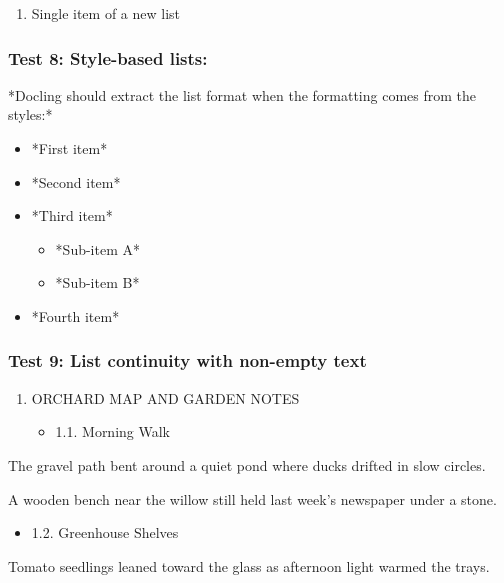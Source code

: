 \documentclass[11pt,a4paper]{article}
\begin{document}
\begin{enumerate}
\item Single item of a new list
\end{enumerate}

\subsubsection{Test 8: Style-based lists:}

*Docling should extract the list format when the formatting comes from the styles:*

\begin{itemize}
\item *First item*
\item *Second item*
\item *Third item*
  \begin{itemize}
\item *Sub-item A*
\item *Sub-item B*
  \end{itemize}
\item *Fourth item*
\end{itemize}

\subsubsection{Test 9: List continuity with non-empty text}

\begin{enumerate}
\item ORCHARD MAP AND GARDEN NOTES
  \begin{itemize}
\item 1.1. Morning Walk
  \end{itemize}
\end{enumerate}

The gravel path bent around a quiet pond where ducks drifted in slow circles.

A wooden bench near the willow still held last week's newspaper under a stone.

\begin{itemize}
\item 1.2. Greenhouse Shelves
\end{itemize}

Tomato seedlings leaned toward the glass as afternoon light warmed the trays.
\end{document}
